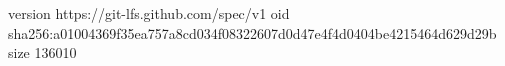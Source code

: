 version https://git-lfs.github.com/spec/v1
oid sha256:a01004369f35ea757a8cd034f08322607d0d47e4f4d0404be4215464d629d29b
size 136010

